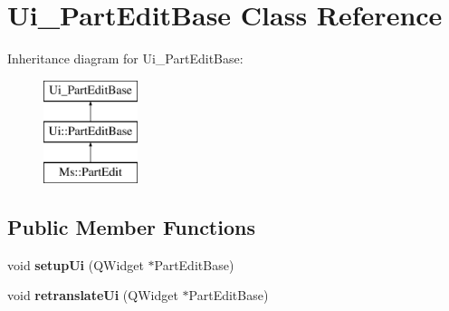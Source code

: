 \hypertarget{class_ui___part_edit_base}{}\section{Ui\+\_\+\+Part\+Edit\+Base Class Reference}
\label{class_ui___part_edit_base}
Inheritance diagram for Ui\+\_\+\+Part\+Edit\+Base\+:\begin{figure}[H]
\begin{center}
\leavevmode
\includegraphics[height=3.000000cm]{class_ui___part_edit_base}
\end{center}
\end{figure}
\subsection*{Public Member Functions}
\begin{DoxyCompactItemize}
\item 
\mbox{\label{class_ui___part_edit_base_ad1e593963705896f16eed9a012620a7f}} 
void {\bfseries setup\+Ui} (Q\+Widget $\ast$Part\+Edit\+Base)
\item 
\mbox{\label{class_ui___part_edit_base_adf5d8ce8b86b66d5ef0e4649fd1e2803}} 
void {\bfseries retranslate\+Ui} (Q\+Widget $\ast$Part\+Edit\+Base)
\end{DoxyCompactItemize}
